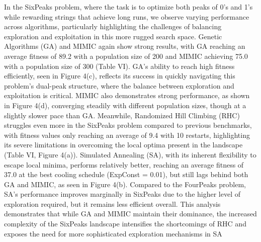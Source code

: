 In the SixPeaks problem, where the task is to optimize both peaks of 0’s and 1’s while rewarding strings that achieve long runs, we observe varying performance across algorithms, particularly highlighting the challenges of balancing exploration and exploitation in this more rugged search space. Genetic Algorithms (GA) and MIMIC again show strong results, with GA reaching an average fitness of 89.2 with a population size of 200 and MIMIC achieving 75.0 with a population size of 300 (Table VI). GA’s ability to reach high fitness efficiently, seen in Figure 4(c), reflects its success in quickly navigating this problem’s dual-peak structure, where the balance between exploration and exploitation is critical. MIMIC also demonstrates strong performance, as shown in Figure 4(d), converging steadily with different population sizes, though at a slightly slower pace than GA. Meanwhile, Randomized Hill Climbing (RHC) struggles even more in the SixPeaks problem compared to previous benchmarks, with fitness values only reaching an average of 9.4 with 10 restarts, highlighting its severe limitations in overcoming the local optima present in the landscape (Table VI, Figure 4(a)). Simulated Annealing (SA), with its inherent flexibility to escape local minima, performs relatively better, reaching an average fitness of 37.0 at the best cooling schedule (ExpConst = 0.01), but still lags behind both GA and MIMIC, as seen in Figure 4(b). Compared to the FourPeaks problem, SA’s performance improves marginally in SixPeaks due to the higher level of exploration required, but it remains less efficient overall. This analysis demonstrates that while GA and MIMIC maintain their dominance, the increased complexity of the SixPeaks landscape intensifies the shortcomings of RHC and exposes the need for more sophisticated exploration mechanisms in SA
